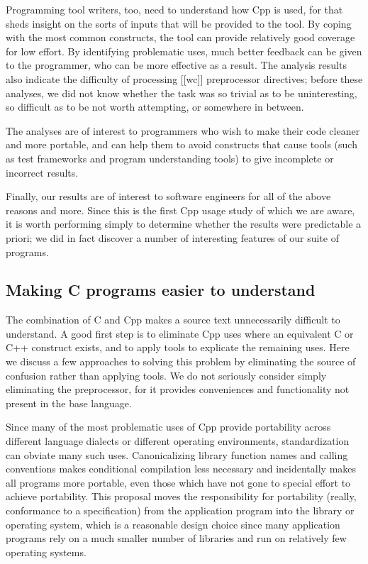 \documentclass[10pt]{article}
\begin{document}
Programming tool writers, too, need to understand how Cpp is used, for that
sheds insight on the sorts of inputs that will be provided to the tool.  By
coping with the most common constructs, the tool can provide relatively
good coverage for low effort.  By identifying problematic uses, much better
feedback can be given to the programmer, who can be more effective as a
result.  The analysis results also indicate the difficulty of processing [[wc]]
preprocessor directives; before these analyses, we did not know whether the
task was so trivial as to be uninteresting, so difficult as to be not worth
attempting, or somewhere in between.

The analyses are of interest to programmers who wish to make their code
cleaner and more portable, and can help them to avoid constructs that cause
tools (such as test frameworks and program understanding tools)
to give incomplete or incorrect results.


Finally, our results are of interest to software engineers for all of the
above reasons and more.  Since this is the first Cpp usage study of which
we are aware, it is worth performing simply to determine whether the
results were predictable a priori; we did in fact discover a number of
interesting features of our suite of programs.


\subsection{Making C programs easier to understand}

The combination of C and Cpp makes a source text unnecessarily difficult to
understand.  A good first step is to eliminate Cpp uses where an equivalent
C or C++ construct exists, and to apply tools to explicate the remaining
uses.  Here we discuss a few approaches to solving this problem by
eliminating the source of confusion rather than applying tools.  We do not
seriously consider simply eliminating the preprocessor, for it provides
conveniences and functionality not present in the base language.

Since many of the most problematic uses of Cpp provide portability across
different language dialects or different operating environments,
standardization can obviate many such uses.  Canonicalizing library
function names and calling conventions makes conditional compilation less
necessary and incidentally makes all programs more portable, even those
which have not gone to special effort to achieve portability.  This
proposal moves the responsibility for portability (really, conformance to a
specification) from the application program into the library or operating
system, which is a reasonable design choice since many application programs
rely on a much smaller number of libraries and run on relatively few
operating systems.
\end{document}
